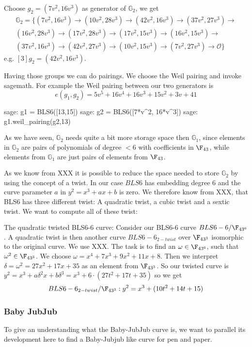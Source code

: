 Choose $g_2=(7v^2, 16v^3)$ as generator of $\mathbb{G}_2$, we get
\begin{multline*}
\mathbb{G}_2=\{
(7v^2, 16v^3) \to
(10v^2, 28v^3)\to
(42v^2, 16v^3)\to
(37v^2, 27v^3)\to\\
(16v^2, 28v^3)\to
(17v^2, 28v^3)\to
(17v^2, 15v^3)\to
(16v^2, 15v^3)\to\\
(37v^2, 16v^3)\to
(42v^2, 27v^3)\to
(10v^2, 15v^3)\to
(7v^2, 27v^3)\to
\mathcal{O}\}
\end{multline*}
e.g. $[3]g_2= (42v^2, 16v^3)$.

Having those groups we can do pairings. We choose the Weil pairing and invoke sagemath. For example the Weil pairing between our two generators is
$$
e(g_1,g_2)= 5v^5 + 16v^4 + 16v^3 + 15v^2 + 3v + 41
$$

\begin{sagecommandline}
sage: g1 = BLS6([13,15])
sage: g2 = BLS6([7*v^2, 16*v^3])
sage: g1.weil_pairing(g2,13)
\end{sagecommandline}

As we have seen, $\mathbb{G}_2$ needs quite a bit more storage space then $\mathbb{G}_1$, since elements in $\mathbb{G}_2$ are pairs of polynomials of degree $<6$ with coefficients in $\F_{43}$, while elements from $\mathbb{G}_1$ are just pairs of elements from $\F_{43}$. 

As we know from XXX it is possible to reduce the space needed to store $\mathbb{G}_2$ by using the concept of a twist. In our case $BLS6$ has embedding degree $6$ and the curve parameter $a$ in $y^2 = x^3 +ax + b$ is zero. We therefore know from XXX, that BLS6 has three different twist: A quadratic twist, a cubic twist and a sextic twist. We want to compute all of these twist:

The quadratic twisted BLS6-6 curve: Consider our BLS6-6 curve $BLS6-6/\F_{43^6}$. A quadratic twist is then another curve $BLS6-6_{2-twist}$ over $\F_{43^3}$ isomorphic to the original curve. We use XXX. The task is to find an $\omega\in \F_{43^6}$, such that $\omega^2 \in \F_{43^3}$. 
We choose $\omega = x^4 + 7x^3 + 9x^2 + 11x + 8$. Then we interpret $\delta = \omega^2 = 27x^2 + 17x + 35$ as an element from $\F_{43^3}$. So our twisted curve is
$y^2 = x^3+a\delta^2 x+b \delta^3 = x^3+6\cdot(27t^2+17t+35)$
so we get
$$
BLS6-6_{2-twist}/\F_{43^3}: y^2 = x^3+(10t^2+14t+15)
$$
\subsubsection{Baby JubJub}
To give an understanding what the Baby-JubJub curve is, we want to parallel its development here to find a Baby-Jubjub like curve for pen and paper.

